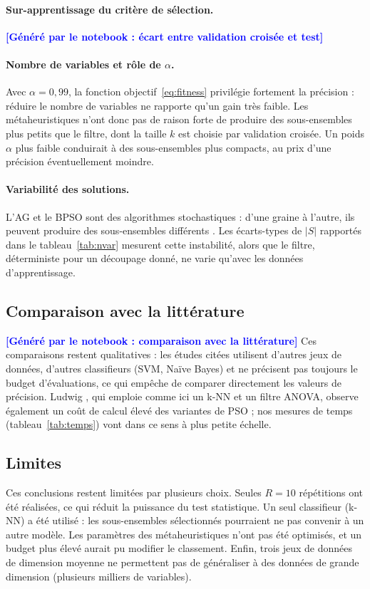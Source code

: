\documentclass[11pt,a4paper]{report}
\newcommand{\attente}[1]{\textcolor{blue}{\textbf{[Généré par le notebook : #1]}}}
\newcommand{\NbRep}{10}
\newcommand{\DiscLitterature}{\attente{comparaison avec la littérature}}
\newcommand{\DiscEcart}{\attente{écart entre validation croisée et test}}
\begin{document}
\paragraph{Sur-apprentissage du critère de sélection.}
\DiscEcart

\paragraph{Nombre de variables et rôle de $\alpha$.}
Avec $\alpha = 0{,}99$, la fonction objectif~\eqref{eq:fitness} privilégie fortement la
précision : réduire le nombre de variables ne rapporte qu'un gain très faible. Les
métaheuristiques n'ont donc pas de raison forte de produire des sous-ensembles plus petits que
le filtre, dont la taille $k$ est choisie par validation croisée. Un poids $\alpha$ plus faible
conduirait à des sous-ensembles plus compacts, au prix d'une précision éventuellement moindre.

\paragraph{Variabilité des solutions.}
L'AG et le BPSO sont des algorithmes stochastiques : d'une graine à l'autre, ils peuvent produire
des sous-ensembles différents \cite{xue2016}. Les écarts-types de $|S|$ rapportés dans le
tableau~\ref{tab:nvar} mesurent cette instabilité, alors que le filtre, déterministe pour un
découpage donné, ne varie qu'avec les données d'apprentissage.

\subsection{Comparaison avec la littérature}
\DiscLitterature{} Ces comparaisons restent qualitatives : les études citées utilisent d'autres
jeux de données, d'autres classifieurs (SVM, Naïve Bayes) et ne précisent pas toujours le budget
d'évaluations, ce qui empêche de comparer directement les valeurs de précision. Ludwig
\cite{ludwig2025}, qui emploie comme ici un k-NN et un filtre ANOVA, observe également un coût de
calcul élevé des variantes de PSO ; nos mesures de temps (tableau~\ref{tab:temps}) vont dans ce
sens à plus petite échelle.

\subsection{Limites}
Ces conclusions restent limitées par plusieurs choix. Seules $R = \NbRep$ répétitions ont été
réalisées, ce qui réduit la puissance du test statistique. Un seul classifieur (k-NN) a été
utilisé : les sous-ensembles sélectionnés pourraient ne pas convenir à un autre modèle. Les
paramètres des métaheuristiques n'ont pas été optimisés, et un budget plus élevé aurait pu
modifier le classement. Enfin, trois jeux de données de dimension moyenne ne permettent pas de
généraliser à des données de grande dimension (plusieurs milliers de variables).
\end{document}
